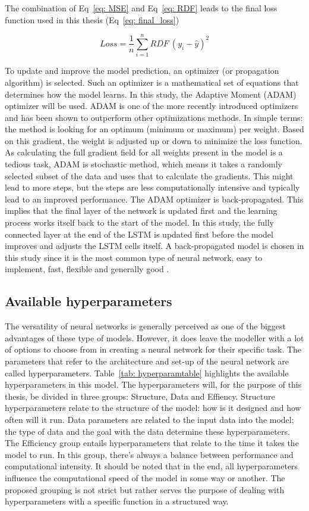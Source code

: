 \documentclass[twocolumn, 10pt, a4paper]{memoir}
\begin{document}
	The combination of Eq~\ref{eq: MSE} and Eq~\ref{eq: RDF} leads to the final loss function used in this thesis (Eq~\ref{eq: final_loss})
	
	\begin{equation}
		\label{eq: final_loss}
		Loss = \frac{1}{n} \sum_{i=1}^{n} RDF \ (y_i - \hat{y})^2
	\end{equation}
	
	To update and improve the model prediction, an optimizer (or propagation algorithm) is selected. Such an optimizer is a mathematical set of equations that determines how the model learns. In this study, the Adaptive Moment (ADAM) optimizer will be used. ADAM is one of the more recently introduced optimizers and has been shown to outperform other optimizations methods. \cite{Kingma2014} In simple terms: the method is looking for an optimum (minimum or maximum) per weight. Based on this gradient, the weight is adjusted up or down to minimize the loss function. As calculating the full gradient field for all weights present in the model is a tedious task, ADAM is stochastic method, which means it takes a randomly selected subset of the data and uses that to calculate the gradients. This might lead to more steps, but the steps are less computationally intensive and typically lead to an improved performance.  
	The ADAM optimizer is back-propagated. This implies that the final layer of the network is updated first and the learning process works itself back to the start of the model. In this study, the fully connected layer at the end of the LSTM is updated first before the model improves and adjusts the LSTM cells itself. A back-propagated model is chosen in this study since it is the most common type of neural network, easy to implement, fast, flexible and generally good \cite{Staudemeyer2019}.
	
	\subsection{Available hyperparameters} \label{Avail hyper}
	The versatility of neural networks is generally perceived as one of the biggest advantages of these type of models. However, it does leave the modeller with a lot of options to choose from in creating a neural network for their specific task. The parameters that refer to the architecture and set-up of the neural network are called hyperparameters. Table~\ref{tab: hyperparamtable} highlights the available hyperparameters in this model. The hyperparameters will, for the purpose of this thesis, be divided in three groups: Structure, Data and Effiency. Structure hyperparameters relate to the structure of the model: how is it designed and how often will it run. Data parameters are related to the input data into the model; the type of data and the goal with the data determine these hyperparameters. The Efficiency group entails hyperparameters that relate to the time it takes the model to run. In this group, there's always a balance between performance and computational intensity. It should be noted that in the end, all hyperparameters influence the computational speed of the model in some way or another. The proposed grouping is not strict but rather serves the purpose of dealing with hyperparameters with a specific function in a structured way.
	
\end{document}

